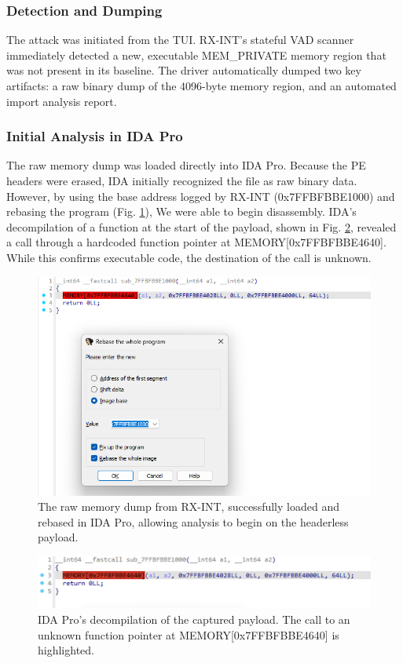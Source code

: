 \documentclass[journal]{IEEEtran}
\begin{document}
\subsubsection{Detection and Dumping}
The attack was initiated from the TUI. RX-INT's stateful VAD scanner immediately detected a new, executable MEM\_PRIVATE memory region that was not present in its baseline. The driver automatically dumped two key artifacts: a raw binary dump of the 4096-byte memory region, and an automated import analysis report.
\subsubsection{Initial Analysis in IDA Pro}
The raw memory dump was loaded directly into IDA Pro. Because the PE headers were erased, IDA initially recognized the file as raw binary data. However, by using the base address logged by RX-INT (0x7FFBFBBE1000) and rebasing the program (Fig. \ref{fig_ida_rebase}), We were able to begin disassembly. IDA's decompilation of a function at the start of the payload, shown in Fig. \ref{fig_ida_pseudo}, revealed a call through a hardcoded function pointer at MEMORY[0x7FFBFBBE4640]. While this confirms executable code, the destination of the call is unknown.
\begin{figure}[!t]
\centering
\includegraphics[width=\columnwidth]{figures/ida_rebase.png}
\caption{The raw memory dump from RX-INT, successfully loaded and rebased in IDA Pro, allowing analysis to begin on the headerless payload.}
\label{fig_ida_rebase}
\end{figure}
\begin{figure}[!t]
\centering
\includegraphics[width=\columnwidth]{figures/ida_pseudocode.png}
\caption{IDA Pro's decompilation of the captured payload. The call to an unknown function pointer at MEMORY[0x7FFBFBBE4640] is highlighted.}
\label{fig_ida_pseudo}
\end{figure}
\end{document}
